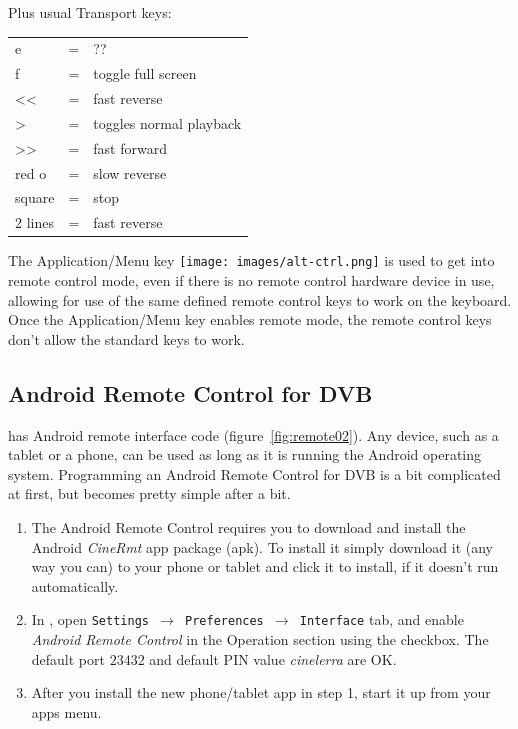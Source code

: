 \noindent Plus usual Transport keys:

\begin{tabular}{lcl}
	\toprule
    e&=&??\\
    
    f&=&toggle full screen\\
    
    <<&=&fast reverse\\
    
    >&=&toggles normal playback\\
    
    >>&=&fast forward\\
    
    red o&=&slow reverse\\
    
    square&=&stop\\
    
    2 lines&=&fast reverse\\
    \bottomrule   
\end{tabular}

The Application/Menu key  \quad
\texttt{[image: images/alt-ctrl.png]} \quad
is used to get into remote control mode, even if there is no remote control hardware device in use, allowing for use of the same defined remote control keys to work on the keyboard.  Once the Application/Menu key enables remote mode, the remote control keys don't allow the standard \CGG{} keys to work.

\subsection{Android Remote Control for DVB}%
\label{sub:android_remote_control_dvb}

\CGGI{} has Android remote interface code (figure~\ref{fig:remote02}). Any device, such as a tablet or a phone, can be used as long as it is running the Android operating system. Programming an Android Remote Control for DVB is a bit complicated at first, but becomes pretty simple after a bit.

\begin{enumerate}
    \item The Android Remote Control requires you to download and install the Android \textit{CineRmt} app package (apk). To install it simply download it (any way you can) to your phone or tablet and click it to install, if it doesn't run automatically.
    \item In \CGG{}, open \texttt{Settings $\rightarrow$ Preferences $\rightarrow$ Interface} tab, and enable \textit{Android Remote Control} in the Operation section using the checkbox. The default port $23432$ and default PIN value \textit{cinelerra} are OK.
    \item After you install the new phone/tablet app in step 1, start it up from your apps menu.
\end{enumerate}

